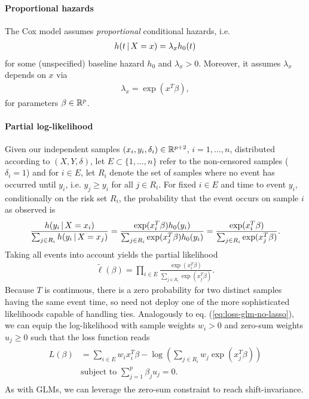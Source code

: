\paragraph{Proportional hazards} The Cox model assumes \textit{proportional} conditional hazards, 
i.e. 
\begin{align}
    h(t \,|\, X = x) = \lambda_x h_0(t) 
\end{align}
for some (unspecified) baseline hazard $h_0$ and $\lambda_x > 0$. Moreover, it assumes $\lambda_x$ depends 
on $x$ via 
\begin{align}
    \lambda_x = \exp(x^T \beta),
\end{align}
for parameters $\beta \in \mathbb{R}^p$.

\paragraph{Partial log-likelihood}
Given our independent samples $(x_i, y_i, \delta_i) \in \mathbb{R}^{p+2}$, $i = 1, \ldots, n$, distributed 
according to $(X, Y, \delta)$, let $E \subset \{ 1, \ldots, n \}$ refer to the non-censored samples 
($\delta_i = 1$) and for $i \in E$, let $R_i$ denote the set of samples where no event has occurred 
until $y_i$, i.e. $y_j \geq y_i$ for all $j \in R_i$. For fixed $i \in E$ and time to event $y_i$,
conditionally on the risk set $R_i$, the probability that the event occurs on sample $i$ as 
observed is
\begin{align}
    \frac{h(y_i \,|\, X = x_i)}{\sum_{j \in R_i} h(y_i \,|\, X = x_j)} = 
    \frac{\exp(x_i^T \beta) h_0(y_i)}{\sum_{j \in R_i} \exp(x_j^T \beta) h_0(y_i)} = 
    \frac{\exp(x_i^T \beta)}{\sum_{j \in R_i} \exp(x_j^T \beta)}.
\end{align}
Taking all events into account yields the partial likelihood 
\begin{align}
    \tilde{\ell}(\beta) = \prod_{i \in E} \frac{\exp(x_i^T \beta)}{\sum_{j \in R_i} \exp(x_j^T 
    \beta)}.
\end{align}
Because $T$ is continuous, there is a zero probability for two distinct samples having the same 
event time, so need not deploy one of the more sophisticated likelihoods capable of handling ties.
Analogously to eq. (\ref{eq:loss-glm-no-lasso}), we can equip the log-likelihood with sample 
weights $w_i > 0$ and zero-sum weights $u_j \geq 0$ such that the loss function reads 
\begin{align}
\begin{split}
    L(\beta) &= \sum_{i \in E} w_i x_i^T \beta - \log \left( \sum_{j \in R_i} w_j \exp(x_j^T
    \beta) \right) \\
    & \text{subject to } \sum_{j=1}^p \beta_j u_j = 0.
\end{split}
\end{align}
As with GLMs, we can leverage the zero-sum constraint to reach shift-invariance.

